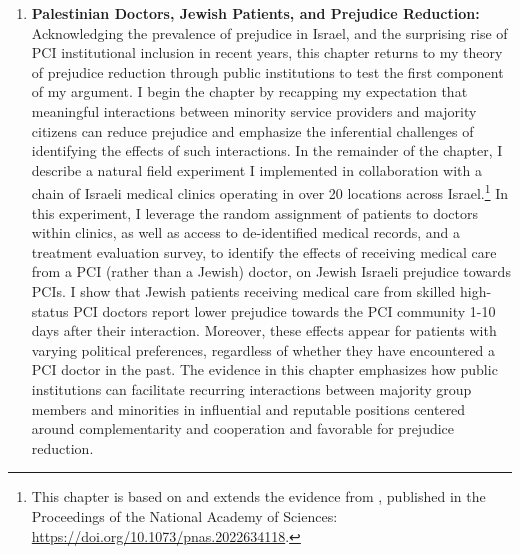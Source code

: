 \documentclass[12pt]{article}
\theoremstyle{plain}
\begin{document}
\begin{enumerate}



\item \textbf{Palestinian Doctors, Jewish Patients, and Prejudice Reduction:} Acknowledging the prevalence of prejudice in Israel, and the surprising rise of PCI institutional inclusion in recent years, this chapter returns to my theory of prejudice reduction through public institutions to test the first component of my argument. I begin the chapter by recapping my expectation that meaningful interactions between minority service providers and majority citizens can reduce prejudice and emphasize the inferential challenges of identifying the effects of such interactions. In the remainder of the chapter, I describe a natural field experiment I implemented in collaboration with a chain of Israeli medical clinics operating in over 20 locations across Israel.\footnote{This chapter is based on and extends the evidence from \citet{Weiss:2021aa}, published in the Proceedings of the National Academy of Sciences: \href{https://doi.org/10.1073/pnas.2022634118}{https://doi.org/10.1073/pnas.2022634118}.} In this experiment, I leverage the random assignment of patients to doctors within clinics, as well as access to de-identified medical records, and a treatment evaluation survey, to identify the effects of receiving medical care from a PCI (rather than a Jewish) doctor, on Jewish Israeli prejudice towards PCIs. I show that Jewish patients receiving medical care from skilled high-status PCI doctors report lower prejudice towards the PCI community 1-10 days after their interaction. Moreover, these effects appear for patients with varying political preferences, regardless of whether they have encountered a PCI doctor in the past. The evidence in this chapter emphasizes how public institutions can facilitate recurring interactions between majority group members and minorities in influential and reputable positions centered around complementarity and cooperation and favorable for prejudice reduction. 



\end{enumerate}
\end{document}
